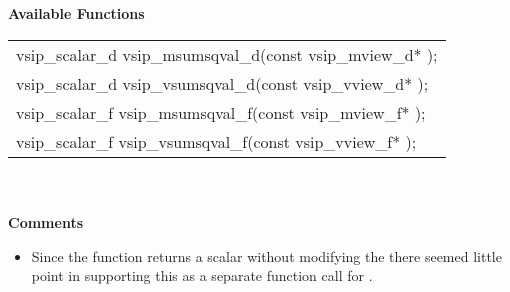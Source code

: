 \\\cvsiplh
\\ \hspace*{.8cm} \vspace*{.1cm} \textbf{Available Functions }
\\ \hspace*{1.1cm} {
\ttfamily
\begin{tabular}[H]{l}
vsip\_scalar\_d vsip\_msumsqval\_d(const vsip\_mview\_d* );\\
vsip\_scalar\_d vsip\_vsumsqval\_d(const vsip\_vview\_d* );\\
vsip\_scalar\_f vsip\_msumsqval\_f(const vsip\_mview\_f* );\\
vsip\_scalar\_f vsip\_vsumsqval\_f(const vsip\_vview\_f* );\\
\end{tabular}
}
\\\pyjvsiph
{}
\\ \hspace*{.8cm} \textbf{Comments}
\\\hspace*{.9cm}\parbox{10.8cm}{\vspace*{.1cm}\begin{itemize}
\item{Since the  function returns a scalar without modifying the  there seemed little point in supporting this as a separate function call for \pyjv.}
\end{itemize}
}
